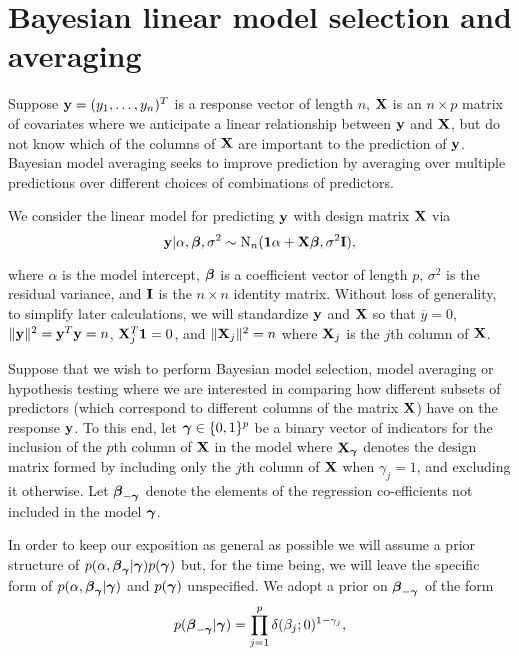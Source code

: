 \section{Bayesian linear model selection and averaging}
\label{sec:bma}

Suppose ${\bf y} = (y_1,\ldots,y_n)^T$ is a response vector of length $n$, ${\bf X}$ is
an $n \times p$ matrix of covariates where we anticipate a linear relationship
between ${\bf y}$ and ${\bf X}$, but do not know which of the columns of ${\bf X}$ are
important to the prediction of ${\bf y}$.  Bayesian model averaging seeks to
improve prediction by averaging over multiple predictions over different
choices of combinations of predictors.

We consider the linear model for predicting ${\bf y}$ with design matrix ${\bf X}$ via
\begin{equation}
	\label{eq:linearModel}
	{\bf y} | \alpha, {\boldsymbol \beta}, \sigma^2 \sim \text{N}_n({\bf 1}\alpha + {\bf X} {\boldsymbol \beta}, \sigma^2 {\bf I}),
\end{equation} 


\noindent where $\alpha$ is the model intercept, ${\boldsymbol \beta}$ is a coefficient
vector of length $p$, $\sigma^2$ is the residual variance, and ${\bf I}$ is the $n
\times n$ identity matrix.  Without loss of generality, to simplify later
calculations, we will standardize ${\bf y}$ and ${\bf X}$ so that $\overline{y} = 0$,
$\|{\bf y}\|^2 = {\bf y}^T{\bf y} = n$, ${\bf X}_j^T{\bf 1} = 0$,  and $\|{\bf X}_j\|^2 = n$ where
${\bf X}_j$ is the $j$th column of ${\bf X}$. 


Suppose that we wish to perform Bayesian model selection, model averaging or
hypothesis testing where we are interested in comparing how different subsets
of predictors (which correspond to different columns of the matrix ${\bf X}$) have
on the response ${\bf y}$. To this end, let ${\boldsymbol \gamma} \in \{0, 1\}^p$ be a binary
vector of indicators for the inclusion of the $p$th column of ${\bf X}$ in the
model where ${\bf X}_{\boldsymbol \gamma}$ denotes the design matrix formed by including only
the $j$th column of ${\bf X}$ when $\gamma_j = 1$, and excluding it otherwise.  Let
${\boldsymbol \beta}_{-{\boldsymbol \gamma}}$ denote the elements of the regression co-efficients not
included in the model ${\boldsymbol \gamma}$.

In order to keep our exposition as general as possible we will assume a prior
structure of $p(\alpha,{\boldsymbol \beta}_{{\boldsymbol \gamma}}|{\boldsymbol \gamma})p({\boldsymbol \gamma})$ but, for the time
being, we will leave the specific form of $p(\alpha,{\boldsymbol \beta}_{{\boldsymbol \gamma}}|{\boldsymbol \gamma})$
and $p({\boldsymbol \gamma})$ unspecified.  We adopt a prior on ${\boldsymbol \beta}_{-{\boldsymbol \gamma}}$  of the
form
\begin{equation}
	\label{eq:spikeAndSlab}
	\displaystyle p({\boldsymbol \beta}_{-{\boldsymbol \gamma}}|{\boldsymbol \gamma}) = \prod_{j=1}^p \delta(\beta_j;0)^{1-\gamma_j},
\end{equation} 


